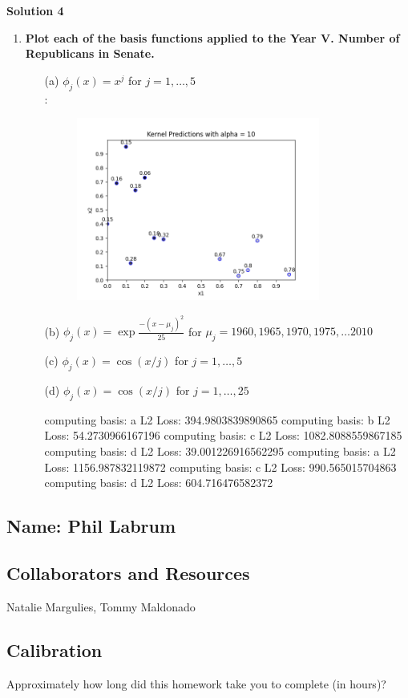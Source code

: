 \documentclass[submit]{harvardml}
\begin{document}
\newpage

\textbf{Solution 4}
\begin{enumerate}
    \item \textbf{Plot each of the basis functions applied to the Year V. Number of Republicans in Senate.}
    \begin{enumerate}
    	\item[(a)] $\phi_j(x) = x^j$ for $j=1, \ldots, 5$\\:
    	\begin{figure}[H]
            \includegraphics[width=8cm]{hw1/T1P2_plots/plot3.png}
            \centering
        \end{figure}
        \item[(b)] $\phi_j(x) = \exp{\frac{-(x-\mu_j)^2}{25}}$ for $\mu_j=1960, 1965, 1970, 1975, \ldots 2010$
    	\item[(c)] $\phi_j(x) = \cos(x / j)$ for $j=1, \ldots, 5$
    	\item[(d)] $\phi_j(x) = \cos(x / j)$ for $j=1, \ldots, 25$
    	
computing basis:  a
L2 Loss:  394.9803839890865
computing basis:  b
L2 Loss:  54.2730966167196
computing basis:  c
L2 Loss:  1082.8088559867185
computing basis:  d
L2 Loss:  39.001226916562295
computing basis:  a
L2 Loss:  1156.987832119872
computing basis:  c
L2 Loss:  990.565015704863
computing basis:  d
L2 Loss:  604.716476582372
    \end{enumerate}
\end{enumerate}

\newpage
\subsection*{Name: Phil Labrum}

\subsection*{Collaborators and Resources}
Natalie Margulies, Tommy Maldonado

\subsection*{Calibration}
Approximately how long did this homework take you to complete (in hours)? 
\end{document}
